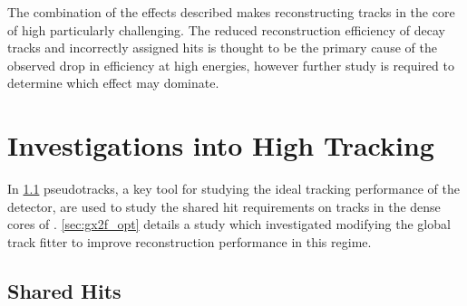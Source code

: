 The combination of the effects described makes reconstructing tracks in the core of high \pT \bjets particularly challenging.
The reduced reconstruction efficiency of \bhadron decay tracks and incorrectly assigned hits is thought to be the primary cause of the observed drop in \btagging efficiency at high energies, however further study is required to determine which effect may dominate.








\section{Investigations into High \texorpdfstring{\pT}{pT} \bhadron Tracking}\label{sec:b_track_reco_improvements}

In \cref{sec:sharedhits} pseudotracks, a key tool for studying the ideal tracking performance of the \ATLAS detector, are used to study the shared hit requirements on tracks in the dense cores of \highpt \bjets.
\cref{sec:gx2f_opt} details a study which investigated modifying the global track fitter to improve reconstruction performance in this regime.


\subsection{Shared Hits}\label{sec:sharedhits}



